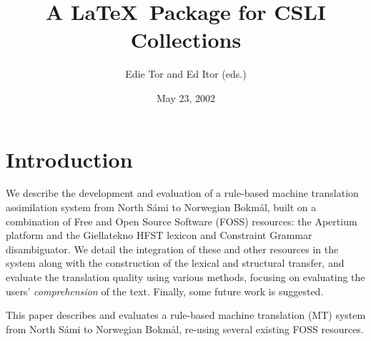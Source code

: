 \documentclass{book}
\title{A \LaTeX\ Package for CSLI Collections}    %
\author{Edie Tor and Ed Itor (eds.)}              %
\date{May 23, 2002}                               %
\begin{document}
\frontmatter      %

\maketitle

\setcounter{page}{5}
\setcounter{tocdepth}{0}  %


\mainmatter




\newcommand{\href}[2]{{\tt #1}} %
\newcommand{\sme}{{\tt sme}}
\newcommand{\nob}{{\tt nob}}
\newcommand{\smenob}{\sme$\rightarrow{}$\nob}
\newcommand{\nobsme}{\nob$\rightarrow{}$\sme}



\section{Introduction} %
  
We describe the development and evaluation of a rule-based machine
translation assimilation system from North S\'{a}mi to Norwegian
Bokm{\aa}l, built on a combination of Free and Open Source Software
(FOSS) resources: the Apertium platform and the Giellatekno HFST
lexicon and Constraint Grammar disambiguator. We detail the
integration of these and other resources in the system along with the
construction of the lexical and structural transfer, and evaluate the
translation quality using various methods, focusing on evaluating the
users' \textit{comprehension} of the text. Finally, some future work
is suggested.


This paper describes and evaluates a rule-based machine translation
(MT) system from North S\'{a}mi to Norwegian Bokm{\aa}l, re-using
several existing FOSS resources. 
\end{document}

